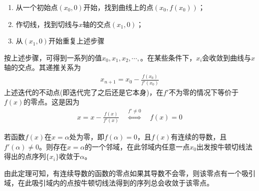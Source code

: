 \begin{enumerate}
\item 从一个初始点$(x_0, 0)$开始，找到曲线上的点$(x_0, f(x_0))$；
\item 作切线，找到切线与$x$轴的交点$(x_1,0)$；
\item 从$(x_1,0)$开始重复上述步骤
\end{enumerate}

按上述步骤，可得到一系列的值$x_0, x_1, x_2, \cdots, $。在某些条件下，$x_i$会收敛到曲线与$x$轴的交点。其递推关系为
\begin{align*}
  x_{n+1}=x_0 - \frac{f(x_0)}{f'(x_0)}
\end{align*}
上述迭代的不动点(即迭代完了之后还是它本身)，在$f'$不为零的情况下等价于$f(x)$的零点。这是因为
\begin{align*}
  x=x-\frac{f(x)}{f'(x)} \quad \overset{f'\ne0}{\iff}\quad f(x)=0
\end{align*}

\begin{theorem}
  若函数$f(x)$在$x=\alpha$处为零，即$f(\alpha)=0$，且$f(x)$有连续的导数，且$f'(\alpha)\ne0$。则存在$x=\alpha$的一个邻域，在此邻域内任意一点$x_0$出发按牛顿切线法得出的点序列$\{x_i\}$收敛于$\alpha$。
\end{theorem}
由此定理可知，有连续导数的函数的零点如果其导数不会零，则该零点有一个吸引域，在此吸引域内的点按牛顿切线法得到的序列总会收敛于该零点。

